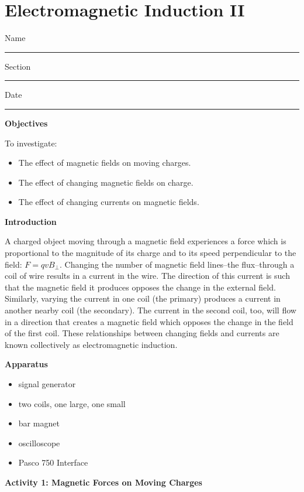 
\section{Electromagnetic Induction II}

Name \rule{2.0in}{0.1pt}\hfill{}Section \rule{1.0in}{0.1pt}\hfill{}Date
\rule{1.0in}{0.1pt}

\textbf{Objectives}

To investigate:

\begin{itemize}
\item The effect of magnetic fields on moving charges. 
\item The effect of changing magnetic fields on charge.
\item The effect of changing currents on magnetic fields.
\end{itemize}
\textbf{Introduction} 

A charged object moving through a magnetic field experiences a force
which is proportional to the magnitude of its charge and to its speed
perpendicular to the field: $F = qvB_\perp$. Changing the number of
magnetic field lines--the flux--through a coil of wire results in
a current in the wire. The direction of this current is such that
the magnetic field it produces opposes the change in the external
field. Similarly, varying the current in one coil (the primary) produces
a current in another nearby coil (the secondary). The current in the
second coil, too, will flow in a direction that creates a magnetic
field which opposes the change in the field of the first coil. These relationships between changing fields and currents are known collectively as electromagnetic induction.

\textbf{Apparatus} 

\begin{itemize}
\item signal generator 
\item two coils, one large, one small 
\item bar magnet
\item oscilloscope
\item Pasco 750 Interface
\end{itemize}
\textbf{Activity 1: Magnetic Forces on Moving Charges }

